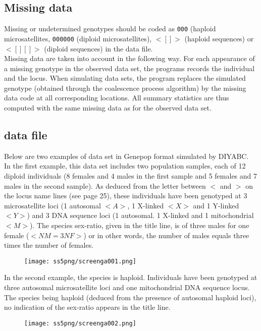 \subsection{Missing data}
Missing or undetermined genotypes should be coded as \texttt{000} (haploid microsatellites, \texttt{000000}  (diploid microsatellites), \texttt{$<[]>$} (haploid sequences) or \texttt{$<[][]>$} (diploid sequences) in the data file. \\
Missing data are taken into account in the following way. For each appearance of a missing genotype in the observed data set, the programs records the individual and the locus. When simulating data sets, the program replaces the simulated genotype (obtained through the coalescence process algorithm) by the missing data code at all corresponding locations. All summary statistics are thus computed with the same missing data as for the observed data set. 

\subsection{data file}
Below are two examples of data set in Genepop format simulated by DIYABC.\\ In the first example, this data set includes two population samples, each of 12 diploid individuals (8 females and 4 males in the first sample and 5 females and 7 males in the second sample). As deduced from the letter between $<$ and $>$ on the locus name lines (see page 25), these individuals have been genotyped at 3 microsatellite loci (1 autosomal $<A>$, 1 X-linked $<X>$ and 1 Y-linked $<Y>$) and 3 DNA sequence loci (1 autosomal. 1 X-linked and 1 mitochondrial $<M>$). The species sex-ratio, given in the title line, is of three males for one female ($<NM=3NF>$) or in other words, the number of males equals three times the number of females. 
\begin{figure}[h]
\texttt{[image: ss5png/screenga001.png]}
\end{figure}

In the second example, the species is haploid. Individuals have been genotyped at three autosomal microsatellite loci and one mitochondrial DNA sequence locus. The species being haploid (deduced from the presence of autosomal haploid loci), no indication of the sex-ratio appears in the title line.

\begin{figure}[h]
\texttt{[image: ss5png/screenga002.png]}
\end{figure}



